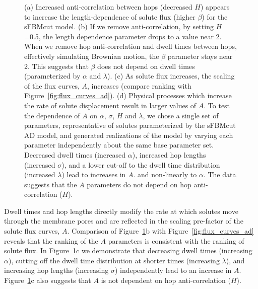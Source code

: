 \documentclass[aps,pre,preprint,groupedaddress,longbibliography]{revtex4-2}
\begin{document}
\begin{figure}
  \caption{(a) Increased anti-correlation between hops (decreased $H$) appears to 
  increase the length-dependence of solute flux (higher $\beta$) for the sFBMcut model.
  (b) If we remove anti-correlation, by setting $H$=0.5, the length dependence parameter
  drops to a value near 2. When we remove hop anti-correlation and dwell times between
  hops, effectively simulating Brownian motion, the $\beta$ parameter stays near 2. 
  This suggests that $\beta$ does not depend on dwell times (parameterized by $\alpha$
  and $\lambda$). (c) As solute flux increases, the scaling of the flux 
  curves, $A$, increases (compare ranking with Figure~\ref{fig:flux_curves_ad}).
  (d) Physical processes which increase the rate of solute displacement 
  result in larger values of $A$. To test the dependence of $A$ on $\alpha$, $\sigma$, 
  $H$ and $\lambda$, we chose a single set of parameters, representative of solutes
  parameterized by the sFBMcut AD model, and generated realizations of the
  model by varying each parameter independently about the same base parameter set. 
  Decreased dwell times (increased $\alpha$), increased hop lengths (increased 
  $\sigma$), and a lower cut-off to the dwell time distribution (increased $\lambda$)
  lead to increases in $A$. 
  and non-linearly to $\alpha$.
  The data suggests that the $A$ parameters do not depend on hop anti-correlation ($H$).
  }\label{fig:beta}
  \end{figure}
    

  Dwell times and hop lengths directly modify the rate at which solutes move 
  through the membrane pores and are reflected in the scaling pre-factor of
  the solute flux curves, $A$. Comparison of Figure~\ref{fig:beta}b with 
  Figure~\ref{fig:flux_curves_ad} reveals that the ranking of the $A$ parameters
  is consistent with the ranking of solute flux. In Figure~\ref{fig:beta}c we
  demonstrate that decreasing dwell times (increasing $\alpha$), cutting off 
  the dwell time distribution at shorter times (increasing $\lambda$), and increasing 
  hop lengths (increasing $\sigma$) independently lead to an increase in $A$. 
  Figure~\ref{fig:beta}c also suggests that $A$ is not dependent on hop 
  anti-correlation ($H$).
  
\end{document}
